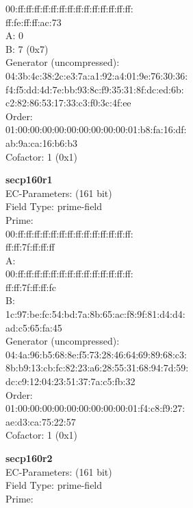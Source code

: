     00:ff:ff:ff:ff:ff:ff:ff:ff:ff:ff:ff:ff:ff:ff:\\
    ff:fe:ff:ff:ac:73\\
A:    0\\
B:    7 (0x7)\\
Generator (uncompressed):\\
    04:3b:4c:38:2c:e3:7a:a1:92:a4:01:9e:76:30:36:\\
    f4:f5:dd:4d:7e:bb:93:8c:f9:35:31:8f:dc:ed:6b:\\
    c2:82:86:53:17:33:c3:f0:3c:4f:ee\\
Order: \\
    01:00:00:00:00:00:00:00:00:00:01:b8:fa:16:df:\\
    ab:9a:ca:16:b6:b3\\
Cofactor:  1 (0x1)\\
\item \textbf{ secp160r1 }\\
EC-Parameters: (161 bit)\\
Field Type: prime-field\\
Prime:\\
    00:ff:ff:ff:ff:ff:ff:ff:ff:ff:ff:ff:ff:ff:ff:\\
    ff:ff:7f:ff:ff:ff\\
A:   \\
    00:ff:ff:ff:ff:ff:ff:ff:ff:ff:ff:ff:ff:ff:ff:\\
    ff:ff:7f:ff:ff:fc\\
B:   \\
    1c:97:be:fc:54:bd:7a:8b:65:ac:f8:9f:81:d4:d4:\\
    ad:c5:65:fa:45\\
Generator (uncompressed):\\
    04:4a:96:b5:68:8e:f5:73:28:46:64:69:89:68:c3:\\
    8b:b9:13:cb:fc:82:23:a6:28:55:31:68:94:7d:59:\\
    dc:c9:12:04:23:51:37:7a:c5:fb:32\\
Order: \\
    01:00:00:00:00:00:00:00:00:00:01:f4:c8:f9:27:\\
    ae:d3:ca:75:22:57\\
Cofactor:  1 (0x1)\\
\item \textbf{ secp160r2 }\\
EC-Parameters: (161 bit)\\
Field Type: prime-field\\
Prime:\\
